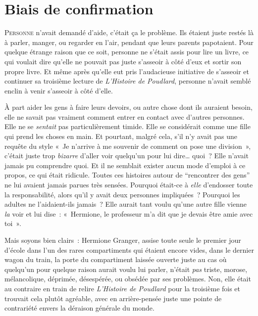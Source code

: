 
\chapter{Biais de confirmation}

\lettrine{P}{ersonne} n'avait demandé d'aide, c'était ça le problème.
Ils étaient juste restés là à parler, manger, ou regarder en l'air, pendant que leurs parents papotaient.
Pour quelque étrange raison que ce soit, personne ne s'était assis pour lire un livre, ce qui voulait dire qu'elle ne pouvait pas juste s'asseoir à côté d'eux et sortir son propre livre.
Et même après qu'elle eut pris l'audacieuse initiative de s'asseoir et continuer sa troisième lecture de \emph{L'Histoire de Poudlard}, personne n'avait semblé enclin à venir s'asseoir à côté d'elle.

À part aider les gens à faire leurs devoirs, ou autre chose dont ils auraient besoin, elle ne savait pas vraiment comment entrer en contact avec d'autres personnes.
Elle ne se \emph{sentait} pas particulièrement timide.
Elle se considérait comme une fille qui prend les choses en main.
Et pourtant, malgré cela, s'il n'y avait pas une requête du style «~Je n'arrive à me souvenir de comment on pose une division~», c'était juste trop \emph{bizarre} d'aller voir quelqu'un pour lui dire… quoi~?
Elle n'avait jamais pu comprendre quoi.
Et il ne semblait exister aucun mode d'emploi à ce propos, ce qui était ridicule.
Toutes ces histoires autour de “rencontrer des gens” ne lui avaient jamais parues très sensées.
Pourquoi était-ce à \emph{elle} d'endosser toute la responsabilité, alors qu'il y avait deux personnes impliquées~?
Pourquoi les adultes ne l'aidaient-ils jamais~?
Elle aurait tant voulu qu'une autre fille vienne \emph{la} voir et lui dise~: «~Hermione, le professeur m'a dit que je devais être amie avec toi~».

Mais soyons bien clairs~: Hermione Granger, assise toute seule le premier jour d'école dans l'un des rares compartiments qui étaient encore vides, dans le dernier wagon du train, la porte du compartiment laissée ouverte juste au cas où quelqu'un pour quelque raison aurait voulu lui parler, n'était \emph{pas} triste, morose, mélancolique, déprimée, désespérée, ou obsédée par ses problèmes.
Non, elle était au contraire en train de relire \emph{L'Histoire de Poudlard} pour la troisième fois et trouvait cela plutôt agréable, avec en arrière-pensée juste une pointe de contrariété envers la déraison générale du monde.

